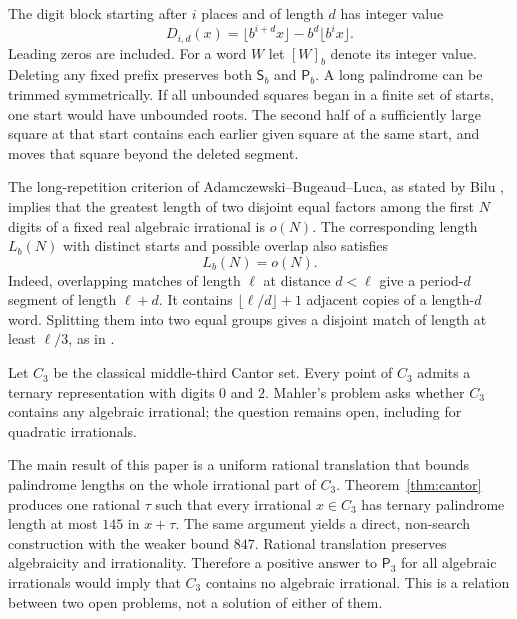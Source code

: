 \documentclass[11pt,reqno,a4paper]{amsart}
\theoremstyle{remark}
\begin{document}
The digit block starting after $i$ places and of length $d$ has integer value
\begin{equation}\label{eq:digitblock}
 D_{i,d}(x)=\lfloor b^{i+d}x\rfloor-b^d\lfloor b^i x\rfloor.
\end{equation}
Leading zeros are included. For a word $W$ let $[W]_b$ denote its integer value. Deleting any fixed prefix preserves both $\mathsf S_b$ and $\mathsf P_b$. A long palindrome can be trimmed symmetrically. If all unbounded squares began in a finite set of starts, one start would have unbounded roots. The second half of a sufficiently large square at that start contains each earlier given square at the same start, and moves that square beyond the deleted segment.

The long-repetition criterion of Adamczewski--Bugeaud--Luca, as stated by Bilu \cite[Theorem~3.3, p.~8]{Bilu}, implies that the greatest length of two disjoint equal factors among the first $N$ digits of a fixed real algebraic irrational is $o(N)$. The corresponding length $L_b(N)$ with distinct starts and possible overlap also satisfies
\begin{equation}\label{eq:known-early}
 L_b(N)=o(N).
\end{equation}
Indeed, overlapping matches of length $\ell$ at distance $d<\ell$ give a period-$d$ segment of length $\ell+d$. It contains $\lfloor\ell/d\rfloor+1$ adjacent copies of a length-$d$ word. Splitting them into two equal groups gives a disjoint match of length at least $\ell/3$, as in \cite[Lemma~3.4]{Bilu}.

Let $C_3$ be the classical middle-third Cantor set. Every point of $C_3$ admits a ternary representation with digits $0$ and $2$. Mahler's problem asks whether $C_3$ contains any algebraic irrational; the question remains open, including for quadratic irrationals.

The main result of this paper is a uniform rational translation that bounds palindrome lengths on the whole irrational part of $C_3$. Theorem~\ref{thm:cantor} produces one rational $\tau$ such that every irrational $x\in C_3$ has ternary palindrome length at most $145$ in $x+\tau$. The same argument yields a direct, non-search construction with the weaker bound $847$. Rational translation preserves algebraicity and irrationality. Therefore a positive answer to $\mathsf P_3$ for all algebraic irrationals would imply that $C_3$ contains no algebraic irrational. This is a relation between two open problems, not a solution of either of them.
\end{document}
